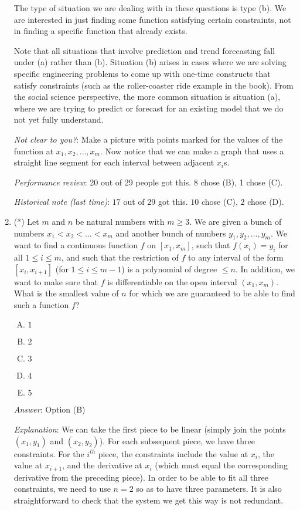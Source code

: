 \documentclass[10pt]{amsart}
\begin{document}
\begin{enumerate}
  The type of situation we are dealing with in these questions is type
  (b). We are interested in just finding some function satisfying
  certain constraints, not in finding a specific function that already
  exists.

  Note that all situations that involve prediction and trend
  forecasting fall under (a) rather than (b). Situation (b) arises in
  cases where we are solving specific engineering problems to come up
  with one-time constructs that satisfy constraints (such as the
  roller-coaster ride example in the book). From the social science
  perspective, the more common situation is situation (a), where we
  are trying to predict or forecast for an existing model that we do
  not yet fully understand.

  {\em Not clear to you?}: Make a picture with points marked for the
  values of the function at $x_1,x_2,\dots,x_m$. Now notice that we
  can make a graph that uses a straight line segment for each interval
  between adjacent $x_i$s.

  {\em Performance review}: 20 out of 29 people got this. 8 chose (B),
  1 chose (C).

  {\em Historical note (last time)}: $17$ out of $29$ got this. $10$ chose (C),
  $2$ chose (D).

\item (*) Let $m$ and $n$ be natural numbers with $m \ge 3$. We are
  given a bunch of numbers $x_1< x_2< \dots<x_m$ and another bunch of
  numbers $y_1,y_2,\dots,y_m$. We want to find a continuous function
  $f$ on $[x_1,x_m]$, such that $f(x_i) = y_i$ for all $1 \le i \le
  m$, and such that the restriction of $f$ to any interval of the form
  $[x_i,x_{i+1}]$ (for $1 \le i \le m - 1$) is a polynomial of degree
  $\le n$. In addition, we want to make sure that $f$ is
  differentiable on the open interval $(x_1,x_m)$. What is the
  smallest value of $n$ for which we are guaranteed to be able to find
  such a function $f$?

  \begin{enumerate}[(A)]
  \item $1$
  \item $2$
  \item $3$
  \item $4$
  \item $5$
  \end{enumerate}

  {\em Answer}: Option (B)

  {\em Explanation}: We can take the first piece to be linear (simply
  join the points $(x_1,y_1)$ and $(x_2,y_2)$). For each subsequent
  piece, we have three constraints. For the $i^{th}$ piece, the
  constraints include the value at $x_i$, the value at $x_{i+1}$, and
  the derivative at $x_i$ (which must equal the corresponding
  derivative from the preceding piece). In order to be able to fit all
  three constraints, we need to use $n = 2$ so as to have three
  parameters. It is also straightforward to check that the system we
  get this way is not redundant.


\end{enumerate}
\end{document}

